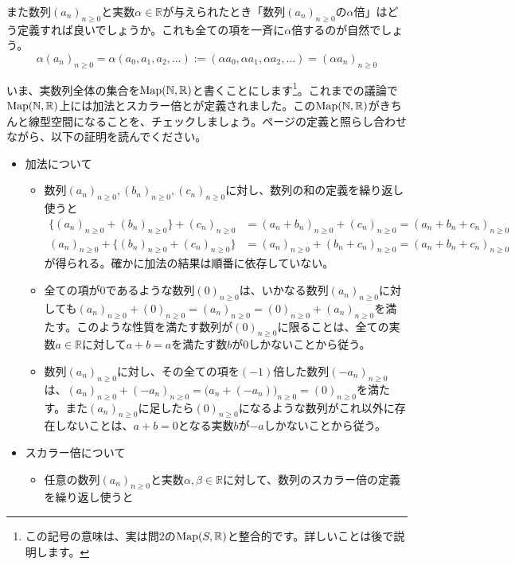 また数列$(a_n)_{n \geq 0}$と実数$\alpha \in \mathbb{R}$が与えられたとき「数列$(a_n)_{n \geq 0}$の$\alpha$倍」はどう定義すれば良いでしょうか。これも全ての項を一斉に$\alpha$倍するのが自然でしょう。
\[
\alpha (a_n)_{n \geq 0} = \alpha (a_0, a_1, a_2, \ldots) := (\alpha a_0, \alpha a_1, \alpha a_2, \ldots) = (\alpha a_n)_{n \geq 0}
\]

いま、実数列全体の集合を$\operatorname{Map}(\mathbb{N}, \mathbb{R})$と書くことにします\footnote{この記号の意味は、実は問$2$の$\operatorname{Map}(S,\mathbb{R})$と整合的です。詳しいことは後で説明します。}。これまでの議論で$\operatorname{Map}(\mathbb{N}, \mathbb{R})$上には加法とスカラー倍とが定義されました。この$\operatorname{Map}(\mathbb{N}, \mathbb{R})$がきちんと線型空間になることを、チェックしましょう。\pageref{def:vector_space}ページの定義と照らし合わせながら、以下の証明を読んでください。
\begin{itemize}
\item 加法について
\begin{itemize}
\item 数列$(a_n)_{n \geq 0}, (b_n)_{n \geq 0}, (c_n)_{n \geq 0}$に対し、数列の和の定義を繰り返し使うと
\begin{align*}
\bigl\{(a_n)_{n \geq 0} + (b_n)_{n \geq 0}\bigr\} + (c_n)_{n \geq 0}
&= (a_n + b_n)_{n \geq 0} + (c_n)_{n \geq 0} = (a_n + b_n + c_n)_{n \geq 0} \\
(a_n)_{n \geq 0} + \bigl\{(b_n)_{n \geq 0} + (c_n)_{n \geq 0}\}
&= (a_n)_{n \geq 0} + (b_n + c_n)_{n \geq 0} = (a_n + b_n + c_n)_{n \geq 0}
\end{align*}
が得られる。確かに加法の結果は順番に依存していない。
\item 全ての項が$0$であるような数列$(0)_{n \geq 0}$は、いかなる数列$(a_n)_{n \geq 0}$に対しても$(a_n)_{n \geq 0} + (0)_{n \geq 0} = (a_n)_{n \geq 0} = (0)_{n \geq 0} + (a_n)_{n \geq 0}$を満たす。このような性質を満たす数列が$(0)_{n \geq 0}$に限ることは、全ての実数$a\in\mathbb{R}$に対して$a + b = a$を満たす数$b$が$0$しかないことから従う。
\item 数列$(a_n)_{n \geq 0}$に対し、その全ての項を$(-1)$倍した数列$(-a_n)_{n \geq 0}$は、$(a_n)_{n \geq 0} + (-a_n)_{n \geq 0} = \bigl(a_n + (-a_n)\bigr)_{n \geq 0} = (0)_{n \geq 0}$を満たす。また$(a_n)_{n \geq 0}$に足したら$(0)_{n \geq 0}$になるような数列がこれ以外に存在しないことは、$a + b = 0$となる実数$b$が$-a$しかないことから従う。
\end{itemize}
\item スカラー倍について
\begin{itemize}
\item 任意の数列$(a_n)_{n \geq 0}$と実数$\alpha, \beta\in\mathbb{R}$に対して、数列のスカラー倍の定義を繰り返し使うと

\end{itemize}
\end{itemize}
